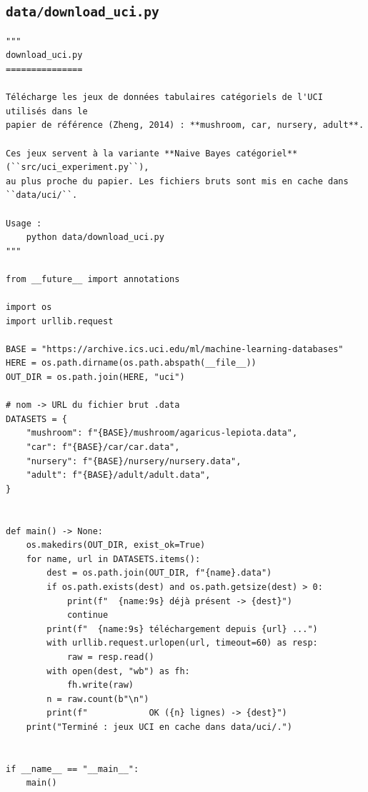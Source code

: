 \subsection{\texttt{data/download\_uci.py}}
\begin{lstlisting}[style=py]
"""
download_uci.py
===============

Télécharge les jeux de données tabulaires catégoriels de l'UCI utilisés dans le
papier de référence (Zheng, 2014) : **mushroom, car, nursery, adult**.

Ces jeux servent à la variante **Naive Bayes catégoriel** (``src/uci_experiment.py``),
au plus proche du papier. Les fichiers bruts sont mis en cache dans ``data/uci/``.

Usage :
    python data/download_uci.py
"""

from __future__ import annotations

import os
import urllib.request

BASE = "https://archive.ics.uci.edu/ml/machine-learning-databases"
HERE = os.path.dirname(os.path.abspath(__file__))
OUT_DIR = os.path.join(HERE, "uci")

# nom -> URL du fichier brut .data
DATASETS = {
    "mushroom": f"{BASE}/mushroom/agaricus-lepiota.data",
    "car": f"{BASE}/car/car.data",
    "nursery": f"{BASE}/nursery/nursery.data",
    "adult": f"{BASE}/adult/adult.data",
}


def main() -> None:
    os.makedirs(OUT_DIR, exist_ok=True)
    for name, url in DATASETS.items():
        dest = os.path.join(OUT_DIR, f"{name}.data")
        if os.path.exists(dest) and os.path.getsize(dest) > 0:
            print(f"  {name:9s} déjà présent -> {dest}")
            continue
        print(f"  {name:9s} téléchargement depuis {url} ...")
        with urllib.request.urlopen(url, timeout=60) as resp:
            raw = resp.read()
        with open(dest, "wb") as fh:
            fh.write(raw)
        n = raw.count(b"\n")
        print(f"            OK ({n} lignes) -> {dest}")
    print("Terminé : jeux UCI en cache dans data/uci/.")


if __name__ == "__main__":
    main()
\end{lstlisting}
